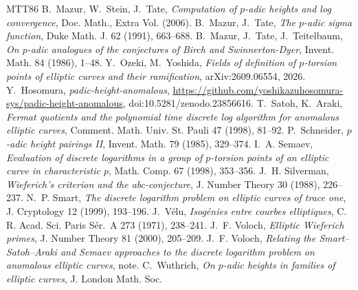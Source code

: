 \documentclass[11pt,a4paper]{amsart}
\theoremstyle{plain}
\theoremstyle{definition}
\theoremstyle{remark}
\begin{document}
\begin{thebibliography}{MTT86}
 B.~Mazur, W.~Stein, J.~Tate, \emph{Computation of $p$-adic heights and log convergence}, Doc. Math., Extra Vol. (2006).
 B.~Mazur, J.~Tate, \emph{The $p$-adic sigma function}, Duke Math. J. 62 (1991), 663--688.
 B.~Mazur, J.~Tate, J.~Teitelbaum, \emph{On $p$-adic analogues of the conjectures of Birch and Swinnerton-Dyer}, Invent. Math. 84 (1986), 1--48.
 Y.~Ozeki, M.~Yoshida, \emph{Fields of definition of $p$-torsion points of elliptic curves and their ramification}, arXiv:2609.06554, 2026.
 Y.~Hosomura, \emph{padic-height-anomalous}, \url{https://github.com/yoshikazuhosomura-sys/padic-height-anomalous}, doi:10.5281/zenodo.23856616.
 T.~Satoh, K.~Araki, \emph{Fermat quotients and the polynomial time discrete log algorithm for anomalous elliptic curves}, Comment. Math. Univ. St. Pauli 47 (1998), 81--92.
 P.~Schneider, \emph{$p$-adic height pairings II}, Invent. Math. 79 (1985), 329--374.
 I.~A. Semaev, \emph{Evaluation of discrete logarithms in a group of $p$-torsion points of an elliptic curve in characteristic $p$}, Math. Comp. 67 (1998), 353--356.
 J.~H. Silverman, \emph{Wieferich's criterion and the abc-conjecture}, J. Number Theory 30 (1988), 226--237.
 N.~P. Smart, \emph{The discrete logarithm problem on elliptic curves of trace one}, J. Cryptology 12 (1999), 193--196.
 J.~Vélu, \emph{Isogénies entre courbes elliptiques}, C. R. Acad. Sci. Paris Sér.~A 273 (1971), 238--241.
 J.~F. Voloch, \emph{Elliptic Wieferich primes}, J. Number Theory 81 (2000), 205--209.
 J.~F. Voloch, \emph{Relating the Smart--Satoh--Araki and Semaev approaches to the discrete logarithm problem on anomalous elliptic curves}, note.
 C.~Wuthrich, \emph{On $p$-adic heights in families of elliptic curves}, J. London Math. Soc.
\end{thebibliography}
\end{document}
